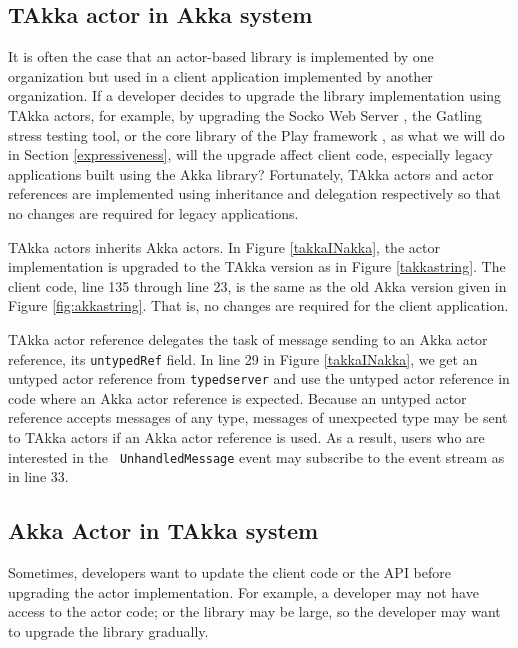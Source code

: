 \subsection{TAkka actor in Akka system}

It is often the case that an actor-based library is implemented by one 
organization but used in a client application implemented by another 
organization.  If a developer decides to upgrade the library implementation 
using TAkka actors, for example, by upgrading the Socko Web Server 
\citep{SOCKO}, the Gatling \citep{Gatling} stress testing tool, or the core 
library of the Play framework \citep{play_doc}, as what we will do in Section 
\ref{expressiveness}, will the upgrade affect client code, especially 
legacy applications built using the Akka library?  Fortunately, TAkka actors and actor 
references are implemented using inheritance and delegation respectively so 
that no changes are required for legacy applications.

TAkka actors inherits Akka actors.  In Figure \ref{takkaINakka}, 
the actor implementation is upgraded to the TAkka version as in Figure 
\ref{takkastring}.  The client code, line 135 through line 23, is the same as the 
old Akka version given in Figure \ref{fig:akkastring}.  That is, no changes are 
required for the client application.

TAkka actor reference delegates the task of message sending to an 
Akka actor reference, its {\tt untypedRef} field.  In line 29 in Figure 
\ref{takkaINakka}, we get an untyped actor reference from {\tt typedserver} 
and 
use the untyped actor reference in code where an Akka actor reference is 
expected.  Because an untyped actor reference accepts messages of any type, 
messages of unexpected type may be sent to TAkka actors if an Akka actor 
reference is used.  As a result, users who are interested in the {\tt 
UnhandledMessage} event may subscribe to the event stream as in line 33.








\subsection{Akka Actor in TAkka system}

Sometimes, developers want to update the client code or the API before upgrading 
the actor implementation. For example, a developer may not have access to 
the actor code; or the library may be large, so the developer may want to 
upgrade the library gradually.

